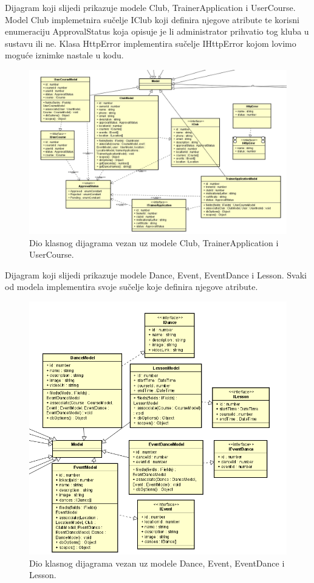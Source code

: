 			\noindent 
			Dijagram koji slijedi prikazuje modele Club, TrainerApplication i UserCourse.
			Model Club implemetnira sučelje IClub koji definira njegove atribute te korisni enumeraciju ApprovalStatus koja opisuje je li 
			administrator prihvatio tog kluba u sustavu ili ne. Klasa HttpError implementira sučelje IHttpError kojom lovimo moguće iznimke 
			nastale u kodu.
			\\
			\begin{figure}[H]
				\includegraphics[scale=0.7]{slike/class2.png}
				\centering
				\caption{Dio klasnog dijagrama vezan uz modele Club, TrainerApplication i UserCourse.}
				\label{fig:class1}
			\end{figure}

			\noindent 
			Dijagram koji slijedi prikazuje modele Dance, Event, EventDance i Lesson. Svaki od modela implementira  svoje sučelje koje definira njegove atribute.
			\\
			\begin{figure}[H]
				\includegraphics[scale=1.0]{slike/class3.png}
				\centering
				\caption{Dio klasnog dijagrama vezan uz modele Dance, Event, EventDance i Lesson.}
				\label{fig:class1}
			\end{figure}

